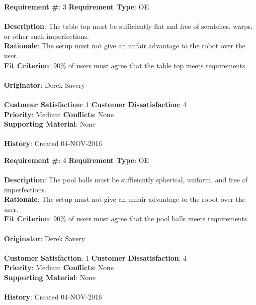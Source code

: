 \documentclass[titlepage]{article}
\begin{document}
\begin{framed}
	\noindent\textbf{Requirement \#}: 3 \hfill \textbf{Requirement Type}: OE\hfill\\\\
	\noindent\textbf{Description}: The table top must be sufficiently flat and free of scratches, warps, or other such imperfections. \\
	\textbf{Rationale}: The setup must not give an unfair advantage to the robot over the user. \\
	\textbf{Fit Criterion}: 90\% of users must agree that the table top meets requirements. \\\\
	\textbf{Originator}: Derek Savery\\\\
	\noindent\textbf{Customer Satisfaction}: 1 \hfill 	\textbf{Customer Dissatisfaction}: 4 \hfill\\
	\textbf{Priority}: Medium \hfill \textbf{Conflicts}: None \hfill\\
	\textbf{Supporting Material}: None\\\\
	\noindent\textbf{History}: Created 04-NOV-2016
\end{framed}

\begin{framed}
	\noindent\textbf{Requirement \#}: 4 \hfill \textbf{Requirement Type}: OE\hfill\\\\
	\noindent\textbf{Description}: The pool balls must be suffieicntly spherical, uniform, and free of imperfections. \\
	\textbf{Rationale}: The setup must not give an unfair advantage to the robot over the user. \\
	\textbf{Fit Criterion}: 90\% of users must agree that the pool balls meets requirements. \\\\
	\textbf{Originator}: Derek Savery\\\\
	\noindent\textbf{Customer Satisfaction}: 1 \hfill 	\textbf{Customer Dissatisfaction}: 4 \hfill\\
	\textbf{Priority}: Medium \hfill \textbf{Conflicts}: None \hfill\\
	\textbf{Supporting Material}: None\\\\
	\noindent\textbf{History}: Created 04-NOV-2016
\end{framed}
\end{document}
